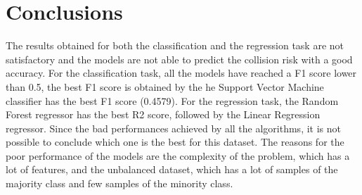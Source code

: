 \section{Conclusions}
The results obtained for both the classification and the regression task are not satisfactory and the models are not able to predict the collision risk with a good accuracy.
For the classification task, all the models have reached a F1 score lower than 0.5, the best F1 score is obtained by the he Support Vector Machine classifier has the best F1 score (0.4579).
For the regression task, the Random Forest regressor has the best R2 score, followed by the Linear Regression regressor.
Since the bad performances achieved by all the algorithms, it is not possible to conclude which one is the best for this dataset.
The reasons for the poor performance of the models are the complexity of the problem, which has a lot of features, and the unbalanced dataset, which has a lot of samples of the majority class and few samples of the minority class.